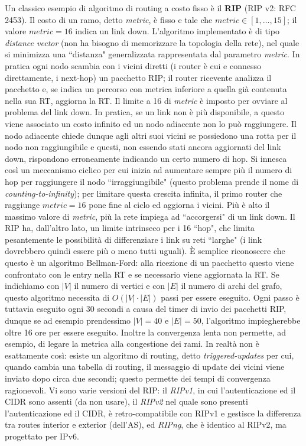 Un classico esempio di algoritmo di routing a costo fisso è il \textbf{RIP} (RIP v2: RFC 2453). Il costo di un ramo, detto \textit{metric}, è fisso e tale che $metric \in [1, \dots, 15]$; il valore $metric = 16$ indica un link down. L'algoritmo implementato è di tipo \textit{distance vector} (non ha bisogno di memorizzare la topologia della rete), nel quale si minimizza una \textquotedblleft distanza" generalizzata rappresentata dal parametro \textit{metric}. In pratica ogni nodo scambia con i vicini diretti (i router è cui e connesso direttamente, i next-hop) un pacchetto RIP; il router ricevente analizza il pacchetto e, se indica un percorso con metrica inferiore a quella già contenuta nella sua RT, aggiorna la RT. Il limite a 16 di \textit{metric} è imposto per ovviare al problema del link down. In pratica, se un link non è più disponibile, a questo viene associato un costo infinito ed un nodo adiacente non lo può raggiungere. Il nodo adiacente chiede dunque agli altri suoi vicini se possiedono una rotta per il nodo non raggiungibile e questi, non essendo stati ancora aggiornati del link down, rispondono erroneamente indicando un certo numero di hop. Si innesca così un meccanismo ciclico per cui inizia ad aumentare sempre più il numero di hop per raggiungere il nodo \textquotedblleft irraggiungibile" (questo problema prende il nome di \textit{counting-to-infinity}); per limitare questa crescita infinita, il primo router che raggiunge $metric = 16$ pone fine al ciclo ed aggiorna i vicini. Più è alto il massimo valore di \textit{metric}, più la rete impiega ad \textquotedblleft accorgersi" di un link down. Il RIP ha, dall'altro lato, un limite intrinseco per i 16 \textquotedblleft hop", che limita pesantemente le possibilità di differenziare i link su reti \textquotedblleft larghe" (i link dovrebbero quindi essere più o meno tutti uguali). È semplice riconoscere che questo è un algoritmo Bellman-Ford: alla ricezione di un pacchetto questo viene confrontato con le entry nella RT e se necessario viene aggiornata la RT. Se indichiamo con $|V|$ il numero di vertici e con $|E|$ il numero di archi del grafo, questo algoritmo necessita di $O(|V|\cdot|E|)$ passi per essere eseguito. Ogni passo è tuttavia eseguito ogni 30 secondi a causa del timer di invio dei pacchetti RIP, dunque se ad esempio prendessimo $|V|=40$ e $|E|=50$, l'algoritmo impiegherebbe oltre 16 ore per essere eseguito. Inoltre la convergenza lenta non permette, ad esempio, di legare la metrica alla congestione dei rami. In realtà non è esattamente così: esiste un algoritmo di routing, detto \textit{triggered-updates} per cui, quando cambia una tabella di routing, il messaggio di update dei vicini viene inviato dopo circa due secondi; questo permette dei tempi di convergenza ragionevoli. Vi sono varie versioni del RIP: il \textit{RIPv1}, in cui l'autenticazione ed il CIDR sono assenti (da non usare), il \textit{RIPv2} nel quale sono presenti l'autenticazione ed il CIDR, è retro-compatibile con RIPv1 e gestisce la differenza tra routes interior e exterior (dell'AS), ed \textit{RIPng}, che è identico al RIPv2, ma progettato per IPv6.\\
